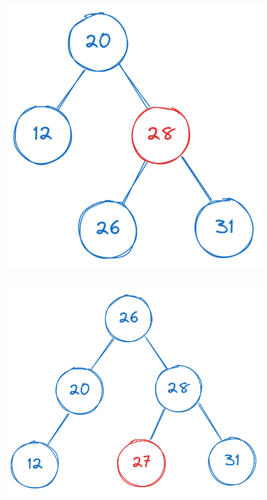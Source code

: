\\ \\
\begin{minipage}[t]{.40\textwidth}
    \vspace{0pt}
     \\
    \centering
    \includegraphics[width=0.73\linewidth]{HWs//HW7//figures/3_5.png}
\end{minipage}
\begin{minipage}[t]{.40\textwidth}
    \vspace{0pt}
     \\
    \centering
    \includegraphics[width=0.93\linewidth]{HWs//HW7//figures/3_6.png}
\end{minipage}

